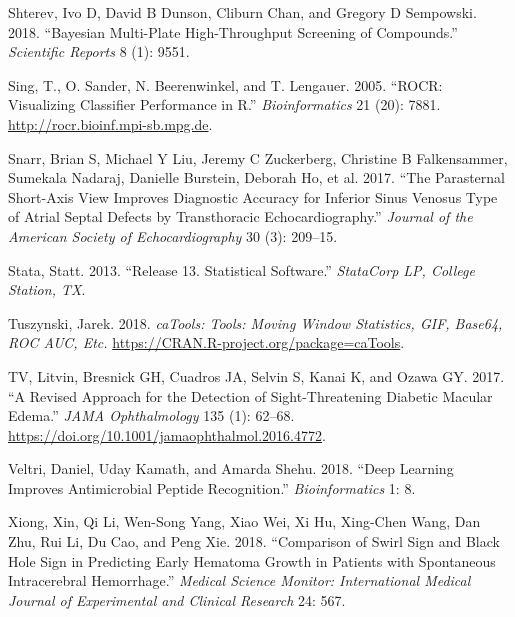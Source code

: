 \documentclass[smallextended]{svjour3}       %
\begin{document}
\leavevmode\hypertarget{ref-shterev2018bayesian}{}%
Shterev, Ivo D, David B Dunson, Cliburn Chan, and Gregory D Sempowski.
2018. ``Bayesian Multi-Plate High-Throughput Screening of Compounds.''
\emph{Scientific Reports} 8 (1): 9551.

\leavevmode\hypertarget{ref-ROCR}{}%
Sing, T., O. Sander, N. Beerenwinkel, and T. Lengauer. 2005. ``ROCR:
Visualizing Classifier Performance in R.'' \emph{Bioinformatics} 21
(20): 7881. \url{http://rocr.bioinf.mpi-sb.mpg.de}.

\leavevmode\hypertarget{ref-snarr2017parasternal}{}%
Snarr, Brian S, Michael Y Liu, Jeremy C Zuckerberg, Christine B
Falkensammer, Sumekala Nadaraj, Danielle Burstein, Deborah Ho, et al.
2017. ``The Parasternal Short-Axis View Improves Diagnostic Accuracy for
Inferior Sinus Venosus Type of Atrial Septal Defects by Transthoracic
Echocardiography.'' \emph{Journal of the American Society of
Echocardiography} 30 (3): 209--15.

\leavevmode\hypertarget{ref-stata}{}%
Stata, Statt. 2013. ``Release 13. Statistical Software.''
\emph{StataCorp LP, College Station, TX}.

\leavevmode\hypertarget{ref-caTools}{}%
Tuszynski, Jarek. 2018. \emph{caTools: Tools: Moving Window Statistics,
GIF, Base64, ROC AUC, Etc.}
\url{https://CRAN.R-project.org/package=caTools}.

\leavevmode\hypertarget{ref-jama2}{}%
TV, Litvin, Bresnick GH, Cuadros JA, Selvin S, Kanai K, and Ozawa GY.
2017. ``A Revised Approach for the Detection of Sight-Threatening
Diabetic Macular Edema.'' \emph{JAMA Ophthalmology} 135 (1): 62--68.
\url{https://doi.org/10.1001/jamaophthalmol.2016.4772}.

\leavevmode\hypertarget{ref-veltri2018deep}{}%
Veltri, Daniel, Uday Kamath, and Amarda Shehu. 2018. ``Deep Learning
Improves Antimicrobial Peptide Recognition.'' \emph{Bioinformatics} 1:
8.

\leavevmode\hypertarget{ref-xiong2018comparison}{}%
Xiong, Xin, Qi Li, Wen-Song Yang, Xiao Wei, Xi Hu, Xing-Chen Wang, Dan
Zhu, Rui Li, Du Cao, and Peng Xie. 2018. ``Comparison of Swirl Sign and
Black Hole Sign in Predicting Early Hematoma Growth in Patients with
Spontaneous Intracerebral Hemorrhage.'' \emph{Medical Science Monitor:
International Medical Journal of Experimental and Clinical Research} 24:
567.



\end{document}
